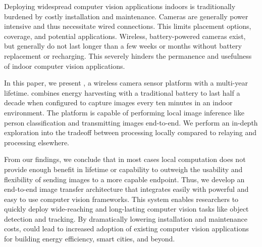 Deploying widespread computer vision applications indoors is traditionally burdened by costly installation and maintenance. Cameras are generally power intensive and thus necessitate wired connections. This limits placement options, coverage, and potential applications. Wireless, battery-powered cameras exist, but generally do not last longer than a few weeks or months without battery replacement or recharging. This severely hinders the permanence and usefulness of indoor computer vision applications.

In this paper, we present \name, a wireless camera sensor platform with a multi-year lifetime. \name combines energy harvesting with a traditional battery to last  half a decade when configured to capture images every ten minutes in an indoor environment. The platform is capable of performing local image inference like person classification and transmitting images end-to-end. We perform an in-depth exploration into the tradeoff between processing locally compared to relaying and processing elsewhere. 

From our findings, we conclude that in most cases local computation does not provide enough benefit in lifetime or capability to outweigh the usability and flexibility of sending images to a more capable endpoint. Thus, we develop an end-to-end image transfer architecture that integrates easily with powerful and easy to use computer vision frameworks. This system enables researchers to quickly deploy wide-reaching and long-lasting computer vision tasks like object detection and tracking. By dramatically lowering installation and maintenance costs, \name could lead to increased adoption of existing computer vision applications for building energy efficiency, smart cities, and beyond.


